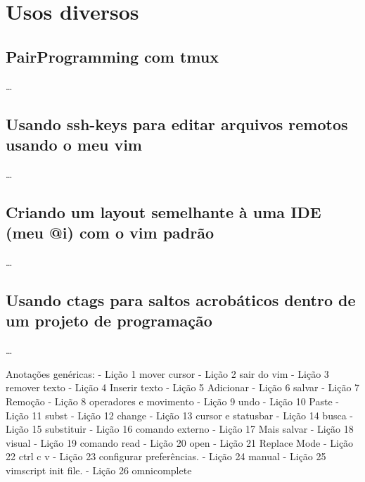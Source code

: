 \documentclass[a4paper,12pt,oneside]{book}
\begin{document}
\newpage
\chapter{Usos diversos}
\section{PairProgramming com tmux}
\ldots
\section{Usando ssh-keys para editar arquivos remotos usando o meu vim}
\ldots
\section{Criando um layout semelhante à uma IDE (meu @i) com o vim padrão}
\ldots
\section{Usando ctags para saltos acrobáticos dentro de um projeto de programação}
\ldots


Anotações genéricas:
- Lição 1 mover cursor
- Lição 2 sair do vim
- Lição 3 remover texto
- Lição 4 Inserir texto
- Lição 5 Adicionar
- Lição 6 salvar
- Lição 7 Remoção
- Lição 8 operadores e movimento
- Lição 9 undo
- Lição 10 Paste
- Lição 11 subst
- Lição 12 change
- Lição 13 cursor e statusbar
- Lição 14 busca
- Lição 15 substituir
- Lição 16 comando externo
- Lição 17 Mais salvar
- Lição 18 visual
- Lição 19 comando read
- Lição 20 open
- Lição 21 Replace Mode
- Lição 22 ctrl c v
- Lição 23 configurar preferências.
- Lição 24 manual
- Lição 25 vimscript init file.
- Lição 26 omnicomplete
\end{document}
